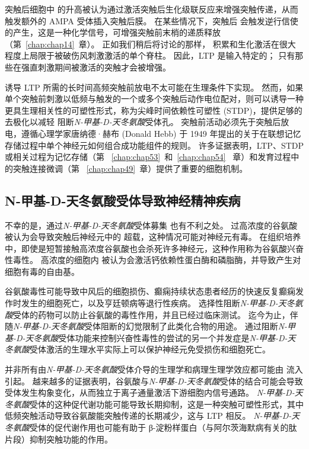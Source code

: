 突触后细胞中  的升高被认为通过激活突触后生化级联反应来增强突触传递，从而触发额外的 AMPA 受体插入突触后膜。
在某些情况下，突触后  会触发逆行信使的产生，这是一种化学信号，可增强突触前末梢的递质释放（第~\ref{chap:chap14}~章）。
正如我们稍后将讨论的那样， 积累和生化激活在很大程度上局限于被破伤风刺激激活的单个脊柱。
因此，LTP 是输入特定的；
只有那些在强直刺激期间被激活的突触才会被增强。


诱导 LTP 所需的长时间高频突触前放电不太可能在生理条件下实现。
然而，如果单个突触前刺激以低频与触发的一个或多个突触后动作电位配对，则可以诱导一种更具生理相关性的可塑性形式，称为尖峰时间依赖性可塑性 (STDP)，提供足够的去极化以减轻  阻断\textit{N-甲基-D-天冬氨酸}受体孔。
突触前活动必须先于突触后放电，遵循心理学家唐纳德·赫布 (Donald Hebb) 于 1949 年提出的关于在联想记忆存储过程中单个神经元如何组合成功能组件的规则。 许多证据表明，LTP、STDP 或相关过程为记忆存储（第 ~\ref{chap:chap53}~和~\ref{chap:chap54}~ 章）和发育过程中的突触连接微调（第 ~\ref{chap:chap49}~章）提供了重要的细胞机制。



\subsection{N-甲基-D-天冬氨酸受体导致神经精神疾病}

不幸的是，通过\textit{N-甲基-D-天冬氨酸}受体募集  也有不利之处。
过高浓度的谷氨酸被认为会导致突触后神经元中的  超载，这种情况可能对神经元有毒。
在组织培养中，即使是短暂接触高浓度谷氨酸也会杀死许多神经元，这种作用称为谷氨酸兴奋性毒性。
高浓度的细胞内  被认为会激活钙依赖性蛋白酶和磷脂酶，并导致产生对细胞有毒的自由基。


谷氨酸毒性可能导致中风后的细胞损伤、癫痫持续状态患者经历的快速反复癫痫发作时发生的细胞死亡，以及亨廷顿病等退行性疾病。
选择性阻断\textit{N-甲基-D-天冬氨酸}受体的药物可以防止谷氨酸的毒性作用，并且已经过临床测试。
迄今为止，伴随\textit{N-甲基-D-天冬氨酸}受体阻断的幻觉限制了此类化合物的用途。
通过阻断\textit{N-甲基-D-天冬氨酸}受体功能来控制兴奋性毒性的尝试的另一个并发症是\textit{N-甲基-D-天冬氨酸}受体激活的生理水平实际上可以保护神经元免受损伤和细胞死亡。


并非所有由\textit{N-甲基-D-天冬氨酸}受体介导的生理学和病理生理学效应都可能由  流入引起。
越来越多的证据表明，谷氨酸与\textit{N-甲基-D-天冬氨酸}受体的结合可能会导致受体发生构象变化，从而独立于离子通量激活下游细胞内信号通路。 
\textit{N-甲基-D-天冬氨酸}受体的这种促代谢功能可能导致长期抑制，这是一种突触可塑性形式，其中低频突触活动导致谷氨酸能突触传递的长期减少，这与 LTP 相反。 
\textit{N-甲基-D-天冬氨酸}受体的促代谢作用也可能有助于 β-淀粉样蛋白（与阿尔茨海默病有关的肽片段）抑制突触功能的作用。


